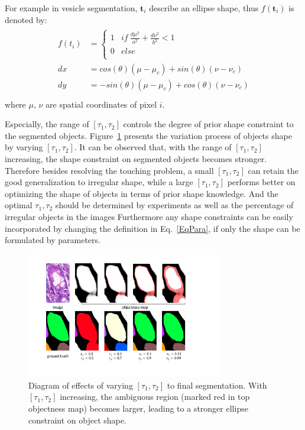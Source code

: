 For example in vesicle segmentation, $\mathbf{t}_i$ describe an ellipse shape, thus $f(\mathbf{t}_i)$ is denoted by:
\begin{eqnarray}\label{fusion1}
\begin{aligned}
f(t_i)&=\left\{\begin{array}{cc}
1&if~\frac{d\mu^2}{a^2}+\frac{d\nu^2}{b^2}<1\\
0&else\\
\end{array}\right.\\
dx &= cos(\theta)(\mu-\mu_c)+sin(\theta)(\nu-\nu_c)\\
dy &= -sin(\theta)(\mu-\mu_c)+cos(\theta)(\nu-\nu_c)\\
\end{aligned}
\end{eqnarray}
where $\mu$, $\nu$ are spatial coordinates of pixel $i$.

Especially, the range of $[\tau_1,\tau_2]$ controls the degree of prior shape constraint to the segmented objects.
Figure~\ref{FigFusion} presents the variation process of objects shape by varying $[\tau_1,\tau_2]$.
It can be observed that, with the range of $[\tau_1,\tau_2]$ increasing, the shape constraint on segmented objects becomes stronger.
Therefore besides resolving the touching problem, a small $[\tau_1,\tau_2]$ can retain the good generalization to irregular shape, while a large $[\tau_1,\tau_2]$ performs better on optimizing the shape of objects in terms of prior shape knowledge.
And the optimal $\tau_1, \tau_2$ should be determined by experiments as well as the percentage of irregular objects in the images  
Furthermore any shape constraints can be easily incorporated by changing the definition in Eq.~\ref{EqPara}, if only the shape can be formulated by parameters.

\begin{figure}
    \begin{center}
        \includegraphics[width=3.4in]{figures/FigFusion.pdf}
    \end{center}
    \caption{Diagram of effects of varying $[\tau_1,\tau_2]$ to final segmentation.
        With $[\tau_1,\tau_2]$ increasing, the ambiguous region (marked red in top objectness map) becomes larger, leading to a stronger ellipse constraint on object shape.}
    \label{FigFusion}
\end{figure}